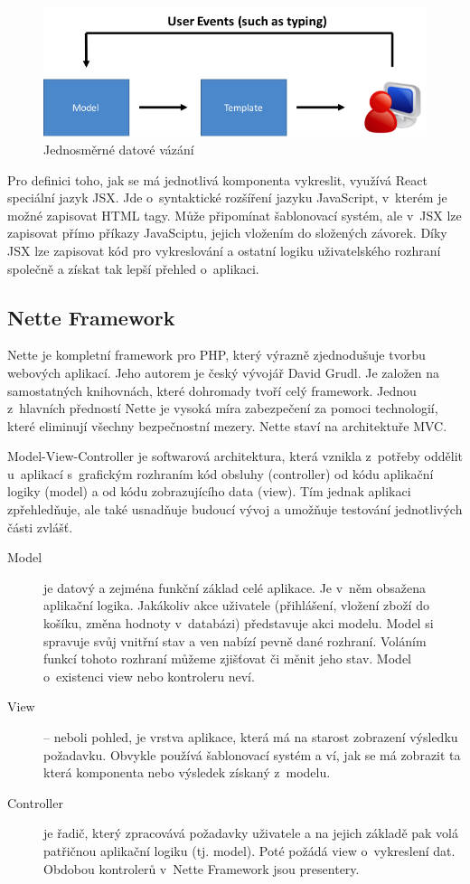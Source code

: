 \documentclass[thesis=B,czech]{FITthesis}[2012/06/26]
\begin{document}
	\begin{figure}
		\includegraphics[width=\textwidth]{databinding2.png}
		\caption{Jednosměrné datové vázání}\label{data_binding}
	\end{figure}

	Pro definici toho, jak se má jednotlivá komponenta vykreslit, využívá React speciální jazyk JSX. Jde o~syntaktické rozšíření jazyku JavaScript, v~kterém je možné zapisovat HTML tagy. Může připomínat šablonovací systém, ale v~JSX lze zapisovat přímo příkazy JavaSciptu, jejich vložením do složených závorek. Díky JSX lze zapisovat kód pro vykreslování a ostatní logiku uživatelského rozhraní společně a získat tak lepší přehled o~aplikaci.\cite{jsx} 
	
\subsection{Nette Framework}
	Nette je kompletní framework pro PHP, který výrazně zjednodušuje tvorbu webových aplikací. Jeho autorem je český vývojář David Grudl. Je založen na samostatných knihovnách, které dohromady tvoří celý framework. Jednou z~hlavních předností Nette je vysoká míra zabezpečení za pomoci technologií, které eliminují všechny bezpečnostní mezery. Nette staví na architektuře MVC.\cite{nette}
	
	Model-View-Controller je softwarová architektura, která vznikla z~potřeby oddělit u~aplikací s~grafickým rozhraním kód obsluhy (controller) od kódu aplikační logiky (model) a od kódu zobrazujícího data (view). Tím jednak aplikaci zpřehledňuje, ale také usnadňuje budoucí vývoj a umožňuje testování jednotlivých části zvlášť.
	
	\begin{description}
		\item[Model] je datový a zejména funkční základ celé aplikace. Je v~něm obsažena aplikační logika. Jakákoliv akce uživatele (přihlášení, vložení zboží do košíku, změna hodnoty v~databázi) představuje akci modelu. Model si spravuje svůj vnitřní stav a ven nabízí pevně dané rozhraní. Voláním funkcí tohoto rozhraní můžeme zjišťovat či měnit jeho stav. Model o~existenci view nebo kontroleru neví.
		\item[View]-- neboli pohled, je vrstva aplikace, která má na starost zobrazení výsledku požadavku. Obvykle používá šablonovací systém a ví, jak se má zobrazit ta která komponenta nebo výsledek získaný z~modelu.
		\item[Controller]je řadič, který zpracovává požadavky uživatele a na jejich základě pak volá patřičnou aplikační logiku (tj. model). Poté požádá view o~vykreslení dat. Obdobou kontrolerů v~Nette Framework jsou presentery.\cite{nette_mvc}
	\end{description}
\end{document}
